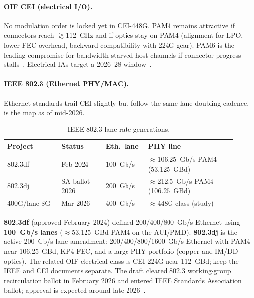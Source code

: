 \paragraph{OIF CEI (electrical I/O).}
No modulation order is locked yet in CEI-448G. PAM4 remains attractive if
connectors reach $\gtrsim$112~GHz and if optics stay on PAM4 (alignment for LPO,
lower FEC overhead, backward compatibility with 224G gear). PAM6 is the leading
compromise for bandwidth-starved host channels if connector progress
stalls~. Electrical IAs target a 2026--28
window~.

\paragraph{IEEE 802.3 (Ethernet PHY/MAC).}
Ethernet standards trail CEI slightly but follow the same lane-doubling cadence.
 is the map as of mid-2026.

\begin{table}[ht]
\centering
\caption{IEEE 802.3 lane-rate generations.\label{tab:ieee-lane}}
\setlength{\tabcolsep}{3pt}%
\footnotesize
\renewcommand{\arraystretch}{1.25}%
\begin{tabular}{@{}p{0.22\linewidth}p{0.18\linewidth}p{0.16\linewidth}p{0.36\linewidth}@{}}
\toprule
Project & Status & Eth.\ lane & PHY line \\
\midrule
802.3df & Feb 2024 & 100~Gb/s & $\approx$106.25~Gb/s PAM4 (53.125~GBd) \\
\addlinespace[1.5em]
802.3dj & SA ballot 2026 & 200~Gb/s & $\approx$212.5~Gb/s PAM4 (106.25~GBd) \\
\addlinespace[1.5em]
802.3 400G/lane SG & Mar 2026 & 400~Gb/s & $\approx$448G class (study) \\
\bottomrule
\end{tabular}
\end{table}

\textbf{802.3df} (approved February 2024) defined 200/400/800~Gb/s Ethernet using
\textbf{100~Gb/s lanes} ($\approx$53.125~GBd PAM4 on the AUI/PMD).
\textbf{802.3dj} is the active 200~Gb/s-lane amendment: 200/400/800/1600~Gb/s
Ethernet with PAM4 near 106.25~GBd, KP4 FEC, and a large PHY portfolio (copper and
IM/DD optics). The related OIF electrical class is CEI-224G near 112~GBd; keep
the IEEE and CEI documents separate. The draft cleared 802.3 working-group
recirculation ballot in February 2026 and entered IEEE Standards Association
ballot; approval is expected around late 2026~.

